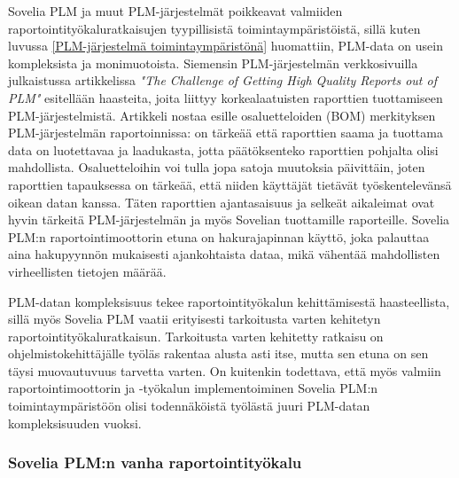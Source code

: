 Sovelia PLM ja muut PLM-järjestelmät poikkeavat valmiiden raportointityökaluratkaisujen tyypillisistä toimintaympäristöistä, sillä kuten luvussa \ref{PLM-järjestelmä toimintaympäristönä} huomattiin, PLM-data on usein kompleksista ja monimuotoista. Siemensin PLM-järjestelmän verkkosivuilla \cite{german_challenge_2016} julkaistussa artikkelissa \textit{"The Challenge of Getting High Quality Reports out of PLM"} esitellään haasteita, joita liittyy korkealaatuisten raporttien tuottamiseen PLM-järjestelmistä. Artikkeli nostaa esille osaluetteloiden (BOM) merkityksen PLM-järjestelmän raportoinnissa: on tärkeää että raporttien saama ja tuottama data on luotettavaa ja laadukasta, jotta päätöksenteko raporttien pohjalta olisi mahdollista. Osaluetteloihin voi tulla jopa satoja muutoksia päivittäin, joten raporttien tapauksessa on tärkeää, että niiden käyttäjät tietävät työskentelevänsä oikean datan kanssa. Täten raporttien ajantasaisuus ja selkeät aikaleimat ovat hyvin tärkeitä PLM-järjestelmän ja myös Sovelian tuottamille raporteille. Sovelia PLM:n raportointimoottorin etuna on hakurajapinnan käyttö, joka palauttaa aina hakupyynnön mukaisesti ajankohtaista dataa, mikä vähentää mahdollisten virheellisten tietojen määrää. \cite{german_challenge_2016}

PLM-datan kompleksisuus tekee raportointityökalun kehittämisestä haasteellista, sillä myös Sovelia PLM vaatii erityisesti tarkoitusta varten kehitetyn raportointityökaluratkaisun. Tarkoitusta varten kehitetty ratkaisu on ohjelmistokehittäjälle työläs rakentaa alusta asti itse, mutta sen etuna on sen täysi muovautuvuus tarvetta varten. On kuitenkin todettava, että myös valmiin raportointimoottorin ja -työkalun implementoiminen Sovelia PLM:n toimintaympäristöön olisi todennäköistä työlästä juuri PLM-datan kompleksisuuden vuoksi.

\subsubsection{Sovelia PLM:n vanha raportointityökalu}

